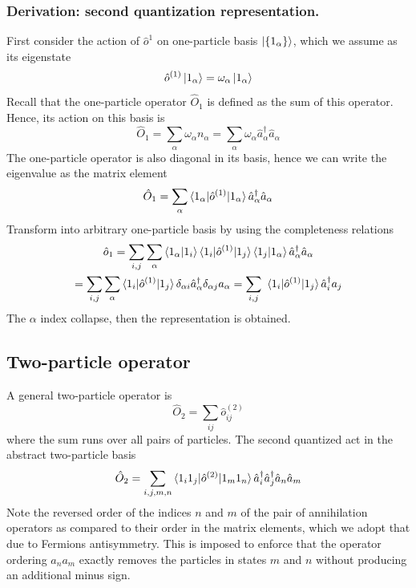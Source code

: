 \documentclass[../../../main.tex]{subfiles}
\begin{document}
\subsubsection{Derivation: second quantization representation.}
First consider the action of $\hat{o} ^{1}$ on one-particle basis $\ket{\left\{ 1_\alpha \right\} }$, which we assume as its eigenstate
\begin{equation*}
  \hat{o } ^{(1)}\ket{1_\alpha } =  \omega_\alpha \ket{1_\alpha}
\end{equation*}
Recall that the one-particle operator $\hat{O }_1$ is defined as the sum of this operator.
Hence, its action on this basis is
\begin{equation*}
  \hat{O }_1 =  \sum_{\alpha } \omega_\alpha n_\alpha = \sum_{\alpha } \omega_\alpha \hat{a}_\alpha ^\dagger \hat{a}_\alpha
\end{equation*}
The one-particle operator is also diagonal in its basis, hence we can write the eigenvalue as the matrix element
\begin{equation*}
  \hat{O }_1
  = \sum_{\alpha } \braket{1_\alpha  | \hat{o } ^{(1)}| 1_\alpha} \hat{a}_\alpha ^\dagger \hat{a}_\alpha
\end{equation*}
Transform into arbitrary one-particle basis by using the completeness relations
\begin{multline*}
  \hat{o }_1
  =\sum_{i,j}  \sum_{\alpha } \braket{1_\alpha  | 1_i} \braket{1_i | \hat{o } ^{(1)}|1_j   } \braket{1_j  | 1_\alpha} \hat{a}_\alpha ^\dagger \hat{a}_\alpha\\
  =\sum_{i,j}  \sum_{\alpha } \braket{1_i | \hat{o } ^{(1)}|1_j   } \delta_{\alpha i} \hat{a}_\alpha ^\dagger \delta_{\alpha j}a_\alpha
  =\sum_{i,j}  \ \braket{1_i | \hat{o } ^{(1)}|1_j   }  \hat{a}_i ^\dagger a_j
\end{multline*}
\begin{equation*}
\end{equation*}
The $\alpha$ index collapse, then the representation is obtained.

\subsection{Two-particle operator}
A general two-particle operator is
\begin{equation*}
  \hat{O }_2 = \sum_{ij } \hat{o }_{ij }^{(2)}
\end{equation*}
where the sum runs over all pairs of particles.
The second quantized act in the abstract two-particle basis
\begin{equation*}
  \hat{O}_2 = \sum_{i,j,m,n} \braket{1_i 1_j  | \hat{o} ^{(2)}| 1_m 1_n } \hat{a}^\dagger_{i}  \hat{a}^\dagger_{j} \hat{a}_n \hat{a}_m
\end{equation*}
Note the reversed order of the indices $n$ and $m$ of the pair of annihilation operators as compared to their order in the matrix elements, which we adopt that due to Fermions antisymmetry.
This is imposed to enforce that the operator ordering $a_na_m$ exactly removes the particles in states $m$ and $n$ without producing an additional minus sign.
\end{document}

